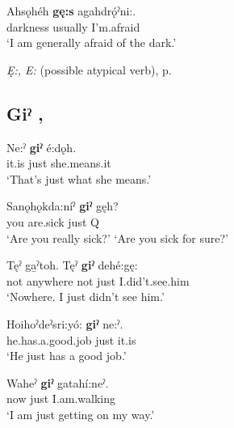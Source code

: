 \ea
\label{ex:gpar68}
\gll Ahsǫhéh \textbf{gę:s} agahdrǫ́ˀni:.\\
darkness usually I’m.afraid\\
\glt ‘I am generally afraid of the dark.’
\z


\begin{CayugaRelated}
\item \textit{Ę:, E:} (possible atypical verb), p. \pageref{p:[ę:, e:] `atypical verb’}
\end{CayugaRelated}

\subsection*{\textbf{Giˀ} , } \label{p:[giˀ]}

\ea
\label{ex:gpar69}
\gll Ne:ˀ \textbf{giˀ} é:dǫh.\\
it.is just she.means.it\\
\glt ‘That’s just what she means.’
\z

\ea
\label{ex:gpar70}
\gll Sanǫhǫkda:níˀ  \textbf{giˀ} gęh?\\
you are.sick just Q\\
\glt ‘Are you really sick?’ `Are you sick for sure?’
\z

\ea
\label{ex:gpar71}
\gll Tęˀ ga̱ˀtoh. Tęˀ  \textbf{giˀ} dehé:gę:\\
not anywhere not just I.did’t.see.him\\
\glt ‘Nowhere. I just didn’t see him.’
\z

\ea
\label{ex:gpar72}
\gll Hoihoˀdeˀsri:yó: \textbf{giˀ} ne:ˀ.\\
he.has.a.good.job just it.is\\
\glt ‘He just has a good job.’
\z

\ea
\label{ex:gpar73}
\gll Waheˀ  \textbf{giˀ} gatahí:neˀ.\\
now just I.am.walking\\
\glt ‘I am just getting on my way.’
\z

